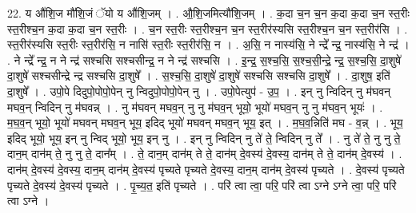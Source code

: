 \documentclass[17pt]{extarticle}
\begin{document}
22. य औ॑शि॒ज मौ॑शि॒जं ॅयो य औ॑शि॒जम् । . औ॒शि॒जमित्यौ॑शि॒जम् । . क॒दा च॒न च॒न क॒दा क॒दा च॒न स्त॒रीः स्त॒रीश्च॒न क॒दा क॒दा च॒न स्त॒रीः । . च॒न स्त॒रीः स्त॒रीश्च॒न च॒न स्त॒रीर॑स्यसि स्त॒रीश्च॒न च॒न स्त॒रीर॑सि । . स्त॒रीर॑स्यसि स्त॒रीः स्त॒रीर॑सि॒ न नासि॑ स्त॒रीः स्त॒रीर॑सि॒ न । . अ॒सि॒ न नास्य॑सि॒ ने न्द्रे᳚ न्द्र॒ नास्य॑सि॒ ने न्द्र॑ । . ने न्द्रे᳚ न्द्र॒ न ने न्द्र॑ सश्चसि सश्चसीन्द्र॒ न ने न्द्र॑ सश्चसि । . इ॒न्द्र॒ स॒श्च॒सि॒ स॒श्च॒सी॒न्द्रे॒ न्द्र॒ स॒श्च॒सि॒ दा॒शुषे॑ दा॒शुषे॑ सश्चसीन्द्रे न्द्र सश्चसि दा॒शुषे᳚ । . स॒श्च॒सि॒ दा॒शुषे॑ दा॒शुषे॑ सश्चसि सश्चसि दा॒शुषे᳚ । . दा॒शुष॒ इति॑ दा॒शुषे᳚ । . उपो॒पे दिदुपो॒पोपो॒पेन् नु न्विदुपो॒पोपो॒पेन् नु । . उपो॒पेत्युप॑ - उ॒प॒ । . इन् नु न्विदिन् नु म॑घवन् मघव॒न् न्विदिन् नु म॑घवन्न् । . नु म॑घवन् मघव॒न् नु नु म॑घव॒न् भूयो॒ भूयो॑ मघव॒न् नु नु म॑घव॒न् भूयः॑ । . म॒घ॒व॒न् भूयो॒ भूयो॑ मघवन् मघव॒न् भूय॒ इदिद् भूयो॑ मघवन् मघव॒न् भूय॒ इत् । . म॒घ॒व॒न्निति॑ मघ - व॒न्न् । . भूय॒ इदिद् भूयो॒ भूय॒ इन् नु न्विद् भूयो॒ भूय॒ इन् नु । . इन् नु न्विदिन् नु ते॑ ते॒ न्विदिन् नु ते᳚ । . नु ते॑ ते॒ नु नु ते॒ दान॒म् दान॑म् ते॒ नु नु ते॒ दान᳚म् । . ते॒ दान॒म् दान॑म् ते ते॒ दान॑म् दे॒वस्य॑ दे॒वस्य॒ दान॑म् ते ते॒ दान॑म् दे॒वस्य॑ । . दान॑म् दे॒वस्य॑ दे॒वस्य॒ दान॒म् दान॑म् दे॒वस्य॑ पृच्यते पृच्यते दे॒वस्य॒ दान॒म् दान॑म् दे॒वस्य॑ पृच्यते । . दे॒वस्य॑ पृच्यते पृच्यते दे॒वस्य॑ दे॒वस्य॑ पृच्यते । . पृ॒च्य॒त॒ इति॑ पृच्यते । . परि॑ त्वा त्वा॒ परि॒ परि॑ त्वा ऽग्ने ऽग्ने त्वा॒ परि॒ परि॑ त्वा ऽग्ने । \newline
\end{document}
